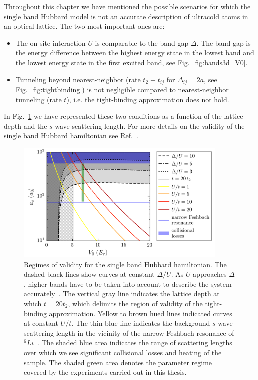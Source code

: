 \documentclass[oneside,11pt]{memoir}
\begin{document}
Throughout this chapter we have mentioned the possible scenarios for which the
single band Hubbard model is not an accurate description of ultracold atoms in
an optical lattice.  The two most important ones are:
\begin{itemize} 
\item The on-site interaction $U$ is comparable to the band gap $\Delta$.  The
band gap is the energy difference between the highest energy state in the
lowest band and the lowest energy state in the first excited band, see
Fig.~\ref{fig:bands3d_V0}. \item Tunneling beyond nearest-neighbor (rate
$t_{2}\equiv t_{ij}$ for $\Delta_{ij}=2a$, see Fig.~\ref{fig:tightbinding}) is
not negligible compared to nearest-neighbor tunneling (rate $t$), i.e.  the
tight-binding approximation does not hold. 
\end{itemize}
In Fig.~\ref{fig:hubbardvalid} we have represented these two conditions as a
function of the lattice depth and the $s$-wave scattering length.  For more
details on the validity of the single band Hubbard hamiltonian see
Ref.~\cite{Werner2005}. 
\begin{figure}
\centering
\includegraphics[width=0.9\textwidth]{../figures/BandStructure_figures/singleband.png}
\caption[Regimes of validity for the single band Hubbard hamiltonian]{\small
Regimes of validity for the single band Hubbard hamiltonian.   The dashed black
lines show curves at constant $\Delta/U$.  As $U$ approaches $\Delta$, higher
bands have to be taken into account to describe the system
accurately~\cite{Werner2005}.  The vertical gray line indicates the lattice
depth at which $t = 20t_{2}$, which delimits the region of validity of the
tight-binding approximation.  Yellow to brown hued lines indicated curves at
constant $U/t$.  The thin blue line indicates the background $s$-wave
scattering length in the vicinity of the narrow Feshbach resonance of
$^{6}Li$~\cite{Strecker2003,Zurn2013}.  The shaded blue area indicates the
range of scattering lengths over which we see significant collisional losses
and heating of the sample.   The shaded green area denotes the parameter regime
covered by the experiments carried out in this thesis.} 
\label{fig:hubbardvalid}
\end{figure}
\end{document}
